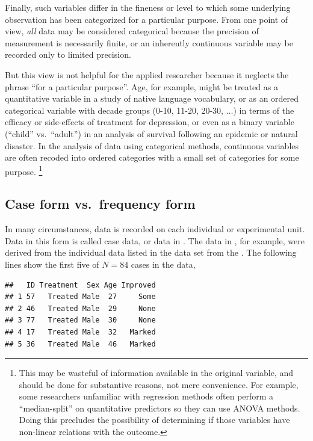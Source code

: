 \documentclass[11pt]{book}
\renewenvironment{knitrout}{\small\renewcommand{\baselinestretch}{.85}}{} %
\begin{document}
Finally, such variables differ in the
fineness or level to which some underlying observation has been
categorized for a particular purpose.
From one point of view, \emph{all} data
may be considered categorical because the precision of measurement
is necessarily finite, or an inherently continuous variable may be recorded only to limited precision.   

But this view is not helpful for the applied
researcher because it neglects the phrase ``for a particular purpose''.
Age, for example, might be treated as a quantitative variable in a study of native language vocabulary, or as an ordered categorical variable 
with decade groups (0-10, 11-20, 20-30, $\dots$)
in terms of
the efficacy or side-effects of treatment for depression, or even as a
binary variable (``child'' vs.\  ``adult'') in an analysis of survival following an epidemic or natural disaster. In the analysis of
data using categorical methods, continuous variables are often recoded
into ordered categories with a small set of categories for some purpose.%
\footnote{
This may be wasteful of information available in the original
variable, and should be done for substantive reasons, not mere
convenience.  For example, some researchers unfamiliar with
regression methods often perform a ``median-split'' on 
quantitative predictors
so they can use ANOVA methods. Doing this precludes the possibility
of determining if those variables have non-linear relations with
the outcome.
}

\subsection{Case form vs.\ frequency form}\label{sec:case-freq}
In many circumstances, data is recorded on each individual or experimental
unit.  Data in this form is called case data,
or data in .
The data in , for example, were derived from
the individual data listed in the data set 
from the .  The following lines show the first
five  of $N=84$ cases in the  data,
\begin{knitrout}
\color{fgcolor}\begin{kframe}
\begin{alltt}
\hlstd{(}\hlstd{,} \hlstd{=}\hlstd{)}
 \hlstd{)}
\end{alltt}
\begin{verbatim}
##   ID Treatment  Sex Age Improved
## 1 57   Treated Male  27     Some
## 2 46   Treated Male  29     None
## 3 77   Treated Male  30     None
## 4 17   Treated Male  32   Marked
## 5 36   Treated Male  46   Marked
\end{verbatim}
\end{kframe}
\end{knitrout}
\end{document}
